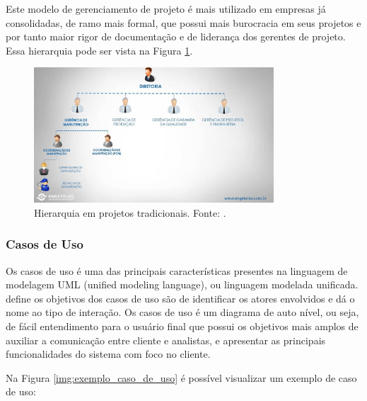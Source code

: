 Este modelo de gerenciamento de projeto é mais utilizado em empresas já consolidadas, de ramo mais formal, que possui mais burocracia em seus projetos e por tanto maior rigor de documentação e de liderança dos gerentes de projeto. Essa hierarquia pode ser vista na Figura \ref{img:gerencia_de_projetos_tradicional}.

\begin{figure}[H]
	\centering
	\includegraphics[width=0.8\textwidth]{figuras/gerencia_de_projeto.jpg}
	\caption{Hierarquia em projetos tradicionais. Fonte: .}
	\label{img:gerencia_de_projetos_tradicional}
\end{figure}

\subsubsection{Casos de Uso}
\label{sec:casos_de_uso}

Os casos de uso é uma das principais características presentes na linguagem de modelagem UML (unified modeling language), ou linguagem modelada unificada.  define os objetivos dos casos de uso são de identificar os atores envolvidos e dá o nome ao tipo de interação. Os casos de uso é um diagrama de auto nível, ou seja, de fácil entendimento para o usuário final que possui os objetivos mais amplos de auxiliar a comunicação entre cliente e analistas, e apresentar as principais funcionalidades do sistema com foco no cliente.

Na Figura \ref{img:exemplo_caso_de_uso} é possível visualizar um exemplo de caso de uso:

